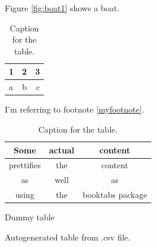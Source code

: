 \documentclass{article}
\begin{document}
Figure \ref{fig:boat1} shows a boat.

\begin{table}[h!]
	\centering
	\caption{Caption for the table.}
	\label{tab:table1}
	\begin{tabular}{l|c||r}
		1 & 2 & 3\\
		\hline
		a & b & c\\
	\end{tabular}
\end{table}

I'm referring to footnote \ref{myfootnote}.

\begin{table}[h!]
	\centering
	\caption{Caption for the table.}
	\label{tab:table2}
	\begin{tabular}{ccc}
		\toprule
		Some & actual & content\\
		\midrule
		prettifies & the & content\\
		as & well & as\\
		using & the & booktabs package\\
		\bottomrule
	\end{tabular}
\end{table}

\newpage
\begin{table}
	\caption{Dummy table}
\end{table}

\begin{table}[h!]
	\begin{center}
		\caption{Autogenerated table from .csv file.}
		\label{table4}
	\end{center}
\end{table}

\newpage
\begin{appendix}
	\listoffigures
	\listoftables
\end{appendix}
\end{document}
